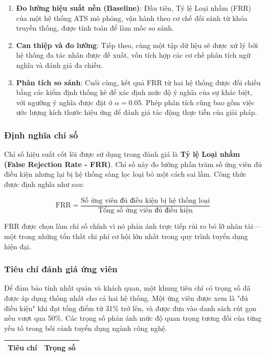 \documentclass{article}
\begin{document}
\begin{itemize}[topsep=0pt, itemsep=4pt, leftmargin=40pt]
\begin{enumerate}[topsep=0pt, itemsep=4pt, leftmargin=40pt, label=\arabic*.]
    \item \textbf{Đo lường hiệu suất nền (Baseline)}: Đầu tiên, Tỷ lệ Loại nhầm (FRR) của một hệ thống ATS mô phỏng, vận hành theo cơ chế đối sánh từ khóa truyền thống, được tính toán để làm mốc so sánh.
    \item \textbf{Can thiệp và đo lường}: Tiếp theo, cùng một tập dữ liệu sẽ được xử lý bởi hệ thống đa tác nhân được đề xuất, vốn tích hợp các cơ chế phân tích ngữ nghĩa và đánh giá đa chiều.
    \item \textbf{Phân tích so sánh}: Cuối cùng, kết quả FRR từ hai hệ thống được đối chiếu bằng các kiểm định thống kê để xác định mức độ ý nghĩa của sự khác biệt, với ngưỡng ý nghĩa được đặt ở $\alpha=0.05$. Phép phân tích cũng bao gồm việc ước lượng kích thước hiệu ứng để đánh giá tác động thực tiễn của giải pháp.
\end{enumerate}

\subsubsection{Định nghĩa chỉ số}
Chỉ số hiệu suất cốt lõi được sử dụng trong đánh giá là \textbf{Tỷ lệ Loại nhầm (False Rejection Rate - FRR)}. Chỉ số này đo lường phần trăm số ứng viên đủ điều kiện nhưng lại bị hệ thống sàng lọc loại bỏ một cách sai lầm. Công thức được định nghĩa như sau:

$$
\text{FRR} = \frac{\text{Số ứng viên đủ điều kiện bị hệ thống loại}}{\text{Tổng số ứng viên đủ điều kiện}}
$$

FRR được chọn làm chỉ số chính vì nó phản ánh trực tiếp rủi ro bỏ lỡ nhân tài—một trong những tổn thất chi phí cơ hội lớn nhất trong quy trình tuyển dụng hiện đại.

\subsubsection{Tiêu chí đánh giá ứng viên}
Để đảm bảo tính nhất quán và khách quan, một khung tiêu chí có trọng số đã được áp dụng thống nhất cho cả hai hệ thống. Một ứng viên được xem là "đủ điều kiện" khi đạt tổng điểm từ 31\% trở lên, và được đưa vào danh sách rút gọn nếu vượt qua 50\%. Các trọng số phản ánh mức độ quan trọng tương đối của từng yếu tố trong bối cảnh tuyển dụng ngành công nghệ.

\begin{longtable}{|
  >{\raggedright\arraybackslash}p{}|
  >{\centering\arraybackslash}p{}|}
  \hline
  \textbf{Tiêu chí} &
  \textbf{Trọng số} \\
  \hline
  \endfirsthead


\end{longtable}
\end{itemize}
\end{document}
